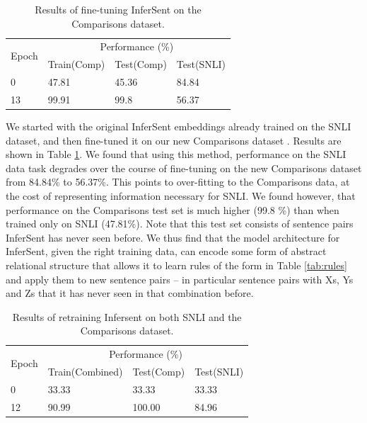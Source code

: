 \begin{table}[htb]
 \centering
  \begin{tabular}{llll}
  \toprule
     \multirow{ 2}{*}{Epoch} &
      \multicolumn{3}{c}{Performance (\%)} \\
       & Train(Comp) & Test(Comp) & Test(SNLI)\\
    \midrule
    0 & 47.81 & 45.36 & 84.84\\
    13 & 99.91 & 99.8 & 56.37\\
    \bottomrule
  \end{tabular}
 \caption{Results of fine-tuning InferSent on the Comparisons dataset.}
  \label{tab:finetuning}
\end{table}

We started with the original InferSent embeddings already trained on the SNLI dataset, and then fine-tuned it on our new Comparisons dataset \citep[using the same protocols used in][to train InferSent]{Conneau:2017uf}. Results are shown in Table \ref{tab:finetuning}. We found that using this method, performance on the SNLI data task degrades over the course of fine-tuning on the new Comparisons dataset from 84.84\% to 56.37\%. This points to over-fitting to the Comparisons data, at the cost of representing information necessary for SNLI. We found however, that performance on the Comparisons test set is much higher (99.8 \%) than when trained only on SNLI (47.81\%). Note that this test set consists of sentence pairs InferSent has never seen before. We thus find that the model architecture for InferSent, given the right training data, can encode some form of abstract relational structure that allows it to learn rules of the form in Table \ref{tab:rules} and apply them to new sentence pairs -- in particular sentence pairs with Xs, Ys and Zs that it has never seen in that combination before.


\begin{table}[htb]
 \centering
  \begin{tabular}{llll}
  \toprule
     \multirow{ 2}{*}{Epoch} &
      \multicolumn{3}{c}{Performance (\%)} \\
       & Train(Combined) & Test(Comp) & Test(SNLI)\\
    \midrule
    0 & 33.33 & 33.33 & 33.33\\
    12 & 90.99  & 100.00 & 84.96\\
    \bottomrule
  \end{tabular}
 \caption{Results of retraining Infersent on both SNLI and the Comparisons dataset.}
  \label{tab:retraining}
\end{table}

